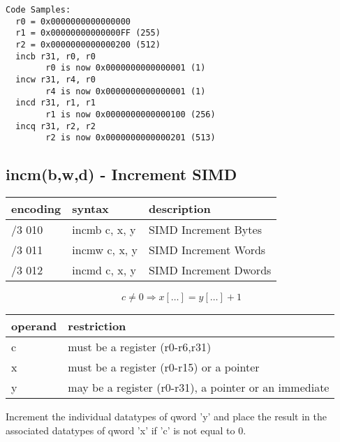 \documentclass[letterpaper,10pt,openright,twoside,onecolumn]{book}
\begin{document}
  \begin{verbatim}
Code Samples:
  r0 = 0x0000000000000000
  r1 = 0x00000000000000FF (255)
  r2 = 0x0000000000000200 (512)
  incb r31, r0, r0
        r0 is now 0x0000000000000001 (1)
  incw r31, r4, r0
        r4 is now 0x0000000000000001 (1)
  incd r31, r1, r1
        r1 is now 0x0000000000000100 (256)
  incq r31, r2, r2
        r2 is now 0x0000000000000201 (513)
  \end{verbatim}
\newpage\subsection{incm(b,w,d) - Increment SIMD}
  \begin{tabular}{|l|l|l|}
   \hline
    encoding & syntax & description \\
   \hline
    /3 010 & incmb c, x, y & SIMD Increment Bytes \\
    /3 011 & incmw c, x, y & SIMD Increment Words \\
    /3 012 & incmd c, x, y & SIMD Increment Dwords \\
   \hline
  \end{tabular}

  \begin{displaymath} c \neq 0 \Rightarrow x[\ldots] = y[\ldots] + 1\end{displaymath}

  \flushleft
  \begin{tabular}{|l|l|}
   \hline
    operand & restriction \\
   \hline
    c & must be a register (r0-r6,r31) \\
    x & must be a register (r0-r15) or a pointer \\
    y & may be a register (r0-r31), a pointer or an immediate \\
   \hline
  \end{tabular}

  Increment the individual datatypes of qword 'y' and place the result in the 
  associated datatypes of qword 'x' if 'c' is not equal to 0.
\end{document}

